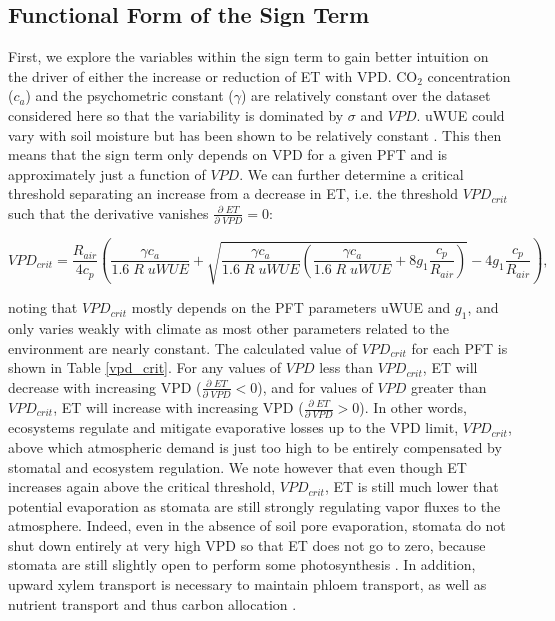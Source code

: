 \documentclass[draft,linenumbers]{agujournal}
\begin{document}
\subsection{Functional Form of the Sign Term}
\label{sign_term}
First, we explore the variables within the sign term to gain better
intuition on the driver of either the increase or reduction of ET with
VPD. CO$_2$ concentration ($c_a$) and the psychometric constant
($\gamma$) are relatively constant over the dataset considered here so
that the variability is dominated by $\sigma$ and $VPD$. uWUE could
vary with soil moisture but has been shown to be relatively constant
\citep{Zhou_2015}. This then means that the sign term only depends on
VPD for a given PFT and is approximately just a function of $VPD$. We
can further determine a critical threshold separating an increase from
a decrease in ET, i.e. the threshold $VPD_{crit}$ such that the
derivative vanishes $\frac{\partial \; ET}{\partial \; VPD} = 0$:
\small
\begin{linenomath*}
  \begin{equation}
    VPD_{crit} = \frac{R_{air}}{4 c_p} \left( \frac{\gamma c_a}{1.6\; R \;  uWUE} + \sqrt{\frac{\gamma c_a}{1.6\; R \;  uWUE}\left( \frac{\gamma c_a}{1.6\; R \;  uWUE} + 8 g_1 \frac{c_p}{R_{air}}\right)} - 4 g_1 \frac{c_p}{R_{air}} \right),
    \label{vpd_min_et}
  \end{equation}
\end{linenomath*}
\normalsize noting that $VPD_{crit}$ mostly depends on the PFT
parameters uWUE and $g_1$, and only varies weakly with climate as most
other parameters related to the environment are nearly constant. The
calculated value of $VPD_{crit}$ for each PFT is shown in Table
\ref{vpd_crit}. For any values of $VPD$ less than $VPD_{crit}$, ET
will decrease with increasing VPD
($\frac{\partial \; ET}{\partial \; VPD} < 0$), and for values of
$VPD$ greater than $VPD_{crit}$, ET will increase with increasing VPD
($\frac{\partial \; ET}{\partial \; VPD} > 0$). In other words,
ecosystems regulate and mitigate evaporative losses up to the VPD
limit, $VPD_{crit}$, above which atmospheric demand is just too high
to be entirely compensated by stomatal and ecosystem regulation. We
note however that even though ET increases again above the critical
threshold, $VPD_{crit}$, ET is still much lower that potential
evaporation as stomata are still strongly regulating vapor fluxes to
the atmosphere. Indeed, even in the absence of soil pore evaporation,
stomata do not shut down entirely at very high VPD so that ET does not
go to zero, because stomata are still slightly open to perform some
photosynthesis \citep{Ball_1987, Leuning_1990, MEDLYN_2011}. In
addition, upward xylem transport is necessary to maintain phloem
transport, as well as nutrient transport and thus carbon allocation
\citep{De_2013, Nikinmaa_2013, Ryan_2014}.
\end{document}
